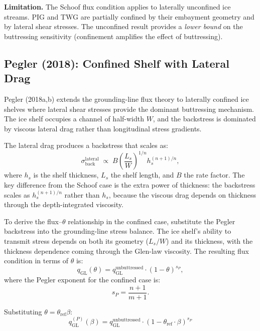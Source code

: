 \documentclass[11pt]{article}
\theoremstyle{definition}
\begin{document}
\textbf{Limitation.}  The Schoof flux condition applies to laterally unconfined ice streams.  PIG and TWG are partially confined by their embayment geometry and by lateral shear stresses.  The unconfined result provides a \emph{lower bound} on the buttressing sensitivity (confinement amplifies the effect of buttressing).

\subsection{Pegler (2018): Confined Shelf with Lateral Drag}
\label{sec:pegler}

Pegler (2018a,b) extends the grounding-line flux theory to laterally confined ice shelves where lateral shear stresses provide the dominant buttressing mechanism.  The ice shelf occupies a channel of half-width $W$, and the backstress is dominated by viscous lateral drag rather than longitudinal stress gradients.

The lateral drag produces a backstress that scales as:
\begin{equation}
  \sigma_{\text{back}}^{\text{lateral}} \;\propto\; B \left(\frac{L_s}{W}\right)^{1/n} h_s^{(n+1)/n},
  \label{eq:pegler_lateral}
\end{equation}
where $h_s$ is the shelf thickness, $L_s$ the shelf length, and $B$ the rate factor.  The key difference from the Schoof case is the extra power of thickness: the backstress scales as $h_s^{(n+1)/n}$ rather than $h_s$, because the viscous drag depends on thickness through the depth-integrated viscosity.

To derive the flux--$\theta$ relationship in the confined case, substitute the Pegler backstress into the grounding-line stress balance.  The ice shelf's ability to transmit stress depends on both its geometry ($L_s/W$) and its thickness, with the thickness dependence coming through the Glen-law viscosity.  The resulting flux condition in terms of $\theta$ is:
\begin{equation}
  q_\text{GL}(\theta) = q_\text{GL}^{\text{unbuttressed}} \cdot (1 - \theta)^{s_P},
  \label{eq:pegler_theta}
\end{equation}
where the Pegler exponent for the confined case is:
\begin{equation}
  \boxed{s_P = \frac{n + 1}{m + 1}.}
  \label{eq:s_pegler}
\end{equation}

Substituting $\theta = \theta_{\text{ref}} \beta$:
\begin{equation}
  \boxed{q_\text{GL}^{(P)}(\beta) = q_\text{GL}^{\text{unbuttressed}} \cdot (1 - \theta_{\text{ref}} \cdot \beta)^{s_P}}
  \label{eq:pegler_beta}
\end{equation}
\end{document}
